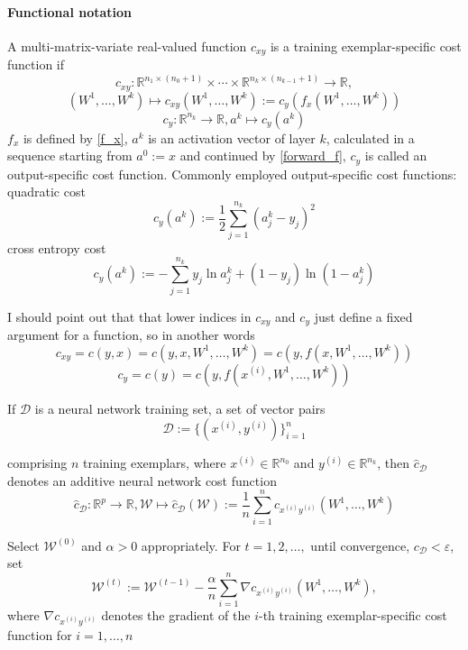 \documentclass[draft]{article}
\def\RealSet{\mathbb{R}}
\begin{document}
\paragraph{Functional notation}
A multi-matrix-variate real-valued function $c_{xy}$ is a training exemplar-specific cost function if
\[
c_{xy} \colon \RealSet^{n_1 \times (n_0 + 1)} \times \cdots \times \RealSet^{n_k \times (n_{k-1} + 1)} \rightarrow \RealSet,
\]
\begin{equation}\label{output_specific_cost_function}
(W^1,\dots,W^k) \mapsto c_{xy}(W^1,\dots,W^k) := c_y(f_x(W^1,\dots,W^k))
\end{equation}
\[
c_y \colon \RealSet^{n_k} \rightarrow \RealSet, a^k \mapsto c_y(a^k)
\]
$f_x$ is defined by \eqref{f_x}, $a^k$ is an activation vector of layer $k$, calculated in a sequence starting from $a^0 := x$ and continued by \eqref{forward_f}, $c_y$ is called an output-specific cost function.
Commonly employed output-specific cost functions: quadratic cost
\[
c_y(a^k) := \frac{1}{2}\sum_{j=1}^{n_k}(a_j^k - y_j)^2
\]
cross entropy cost
\[
  c_y(a^k) := - \sum_{j=1}^{n_k}y_j \ln a_j^k + (1-y_j)\ln(1-a_j^k)
\]

I should point out that that lower indices in $c_{xy}$ and $c_y$ just define a fixed argument for a function, so in another words
\[
c_{xy} = c(y, x) = c(y, x, W^1,\dots,W^k) = c(y, f(x, W^1,\dots,W^k))
\]
\[
c_y = c(y) = c(y, f(x^{(i)}, W^1,\dots,W^k))
\]

If $\mathcal{D}$ is a neural network training set, a set of vector pairs
\[
\mathcal{D} := \bigl\{ (x^{(i)}, y^{(i)}) \bigr\}_{i=1}^n
\]

comprising $n$ training exemplars, where $x^{(i)} \in \RealSet^{n_0}$ and $y^{(i)} \in \RealSet^{n_k}$, then $\hat c_{\mathcal{D}}$ denotes an additive neural network cost function
\begin{equation}\label{additive_cost_function}
\hat c_{\mathcal{D}} \colon \RealSet^p \rightarrow \RealSet, \mathcal{W}\mapsto \hat c_{\mathcal{D}}(\mathcal{W}) := \frac{1}{n} \sum_{i=1}^{n}c_{x^{(i)}y^{(i)}}(W^1,\dots,W^k)
\end{equation}

Select $\mathcal{W}^{(0)}$ and $\alpha > 0$ appropriately. For $t = 1,2,\dots,$ until convergence, $c_{\mathcal{D}} < \varepsilon$, set
\[
\mathcal{W}^{(t)} := \mathcal{W}^{(t-1)} - \frac{\alpha}{n} \sum_{i=1}^n \nabla c_{x^{(i)}y^{(i)}}(W^1,\dots,W^k),
\]
where $\nabla c_{x^{(i)}y^{(i)}}$ denotes the gradient of the $i$-th training exemplar-specific cost function for $i = 1,\dots,n$
\end{document}
